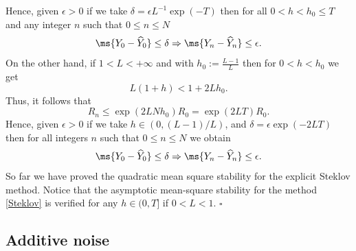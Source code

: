 \begin{Proof}
\begin{equation}
      \end{equation}
      Hence, given $\epsilon>0$ if we take $\delta =\epsilon L^{-1}\exp(-T)$ then
      for all $0<h<h_0\leq T$ and any integer $n$ such that $0\leq n \leq N$
      \begin{equation*}
	\ms{Y_0-\widehat{Y}_0}\leq \delta 
	\Rightarrow
	\ms{Y_n-\widehat{Y}_n}\leq \epsilon.
      \end{equation*}
      On the other hand, if $1<L<+\infty$ and with $h_0:=\frac{L-1}{L}$ then for $0<h<h_0$
      we get
      $$
	L(1+h)<1+2Lh_0.
      $$
      Thus, it follows that
      \begin{equation*}
	R_n\leq \exp(2LNh_0)R_0
	=\exp(2LT)R_0.
      \end{equation*}
      Hence, given $\epsilon>0$ if we take $h\in(0,(L-1)/L)$, and 
      $\delta=\epsilon \exp(-2LT)$ then for all integers $n$ such 
      that $0\leq n \leq N$ we obtain
      \begin{equation*}
	\ms{Y_0-\widehat{Y}_0}\leq \delta
	\Rightarrow
	\ms{Y_n-\widehat{Y}_n}\leq \epsilon.
      \end{equation*}
      So far we have proved the quadratic mean square stability for the explicit Steklov
      method. Notice that the asymptotic mean-square stability for the method
      \eqref{Steklov} is verified for  any $h\in(0,T]$ if $0<L<1$. $\square$
    \end{Proof}
  \subsection{Additive noise}
   
